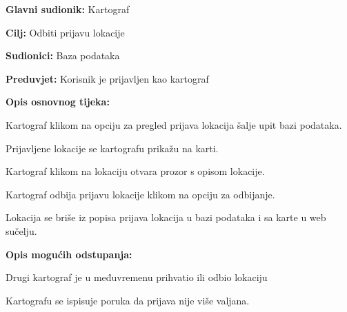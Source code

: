 				\noindent {}
				\begin{packed_item}
					
					\item \textbf{Glavni sudionik: }Kartograf
					\item  \textbf{Cilj:} Odbiti prijavu lokacije
					\item  \textbf{Sudionici:} Baza podataka
					\item  \textbf{Preduvjet:} Korisnik je prijavljen kao kartograf
					\item  \textbf{Opis osnovnog tijeka:}
					
					\item[] \begin{packed_enum}
						
						\item Kartograf klikom na opciju za pregled prijava lokacija šalje upit bazi podataka.
						\item Prijavljene lokacije se kartografu prikažu na karti.
						\item Kartograf klikom na lokaciju otvara prozor s opisom lokacije.
						\item Kartograf odbija prijavu lokacije klikom na opciju za odbijanje.
						\item Lokacija se briše iz popisa prijava lokacija u bazi podataka i sa karte u web sučelju.
					\end{packed_enum}
					
					\item  \textbf{Opis mogućih odstupanja:}
					
					\item[] \begin{packed_item}
						
						\item[3.a] Drugi kartograf je u međuvremenu prihvatio ili odbio lokaciju
						\item[] \begin{packed_enum}
							
							\item Kartografu se ispisuje poruka da prijava nije više valjana.
							
						\end{packed_enum}
						
					\end{packed_item}
				\end{packed_item}
				
